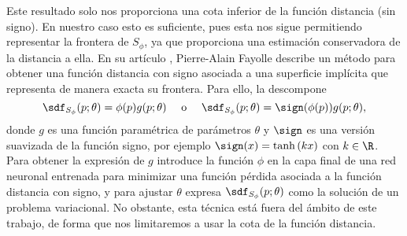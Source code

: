 Este resultado solo nos proporciona una cota inferior de la función distancia (sin signo). En nuestro caso esto es suficiente, pues esta nos sigue permitiendo representar la frontera de $S_{\phi}$, ya que proporciona una estimación conservadora de la distancia a ella. En su artículo \cite{art:impSdf}, Pierre-Alain Fayolle describe un método para obtener una función distancia con signo asociada a una superficie implícita que representa de manera exacta su frontera. Para ello, la descompone 
\begin{equation*}
    \sdf_{S_{\phi}}(p;\theta) = \phi(p)g(p;\theta)\quad \text{ o }\quad \sdf_{S_{\phi}}(p;\theta) = \sign(\phi(p))g(p;\theta),
\end{equation*}
donde $g$ es una función paramétrica de parámetros $\theta$ y $\sign$ es una versión suavizada de la función signo, por ejemplo $\sign(x) = \tanh{(kx)}$ con $k\in\R$. Para obtener la expresión de $g$ introduce la función $\phi$ en la capa final de una red neuronal entrenada para  minimizar una función pérdida asociada a la función distancia con signo, y para ajustar $\theta$ expresa $\sdf_{S_{\phi}}(p;\theta)$ como la solución de un problema variacional. No obstante, esta técnica está fuera del ámbito de este trabajo, de forma que nos limitaremos a usar la cota de la función distancia.